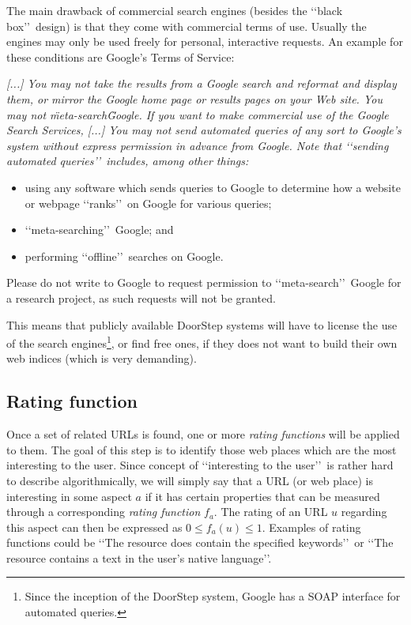 \documentclass[a4paper,twoside]{danarticle}
\theoremstyle{remark}
\begin{document}
       The main drawback of commercial search engines (besides the \lq\lq black 
       box\rq\rq\ design) is that they come with commercial terms of use. 
       Usually the
       engines may only be used freely for personal, interactive requests. An 
       example for these conditions are Google's Terms of Service\cite{googletou}:
       \begin{center}
       \begin{minipage}{10cm}
       \itshape
       [...] You may not take the
       results from a Google search and reformat and display them, or mirror
       the Google home page or results pages on your Web site. You may not
       \"meta-search\" Google. If you want to make commercial use of the Google
       Search Services, 
       [...]
       You may not send automated queries of any sort to Google's system
       without express permission in advance from Google. Note that 
       \lq\lq sending
       automated queries\rq\rq\ includes, among other things:
       \begin{itemize}
       \item{using any software which sends queries to Google to determine how
             a website or webpage \lq\lq ranks\rq\rq\ on Google for various 
             queries;}
       \item{\lq\lq meta-searching\rq\rq\ Google; and}
       \item{performing \lq\lq offline\rq\rq\ searches on Google.}
       \end{itemize}
       Please do not write to Google to request permission to 
       \lq\lq meta-search\rq\rq\
       Google for a research project, as such requests will not be granted.
       \end{minipage}
       \end{center}
       This means that publicly available DoorStep systems will have to license 
       the use of the search 
       engines\footnote{Since the inception of the DoorStep system, Google has
       a SOAP interface for automated queries.}, 
       or find free ones, if they does not want to 
       build their own web indices (which is very demanding).
     \subsection{Rating function}
       Once a set of related URLs is found, one or more 
       \textit{rating functions} will be applied to them. The goal
       of this step is to identify those web places which are the
       most interesting to the user. Since concept of \lq\lq interesting to the
       user\rq\rq\ is rather hard to describe algorithmically, we will simply 
       say that a URL (or web place) is
       interesting in some aspect $ a $ if it has certain properties that can be
       measured through a corresponding \textit{rating function} 
       $ f_a $. The rating of an URL $ u $ regarding this aspect
       can then be expressed as $ 0 \leq f_a(u) \leq 1 $.
       Examples of rating
       functions could be \lq\lq The resource does contain the specified
       keywords\rq\rq\ or \lq\lq The resource contains a text in the user's
       native language\rq\rq .
       
\end{document}
